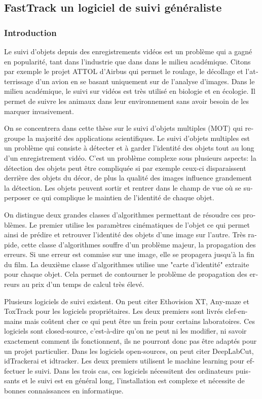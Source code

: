 \begin{otherlanguage}{french}
\subsubsection*{}
\subsection*{FastTrack un logiciel de suivi généraliste}
\subsubsection*{Introduction}
Le suivi d'objets depuis des enregistrements vidéos est un problème qui a gagné en popularité, tant dans l'industrie que dans dans le milieu académique. Citons par exemple le projet ATTOL d'Airbus qui permet le roulage, le décollage et l'atterrissage d'un avion en se basant uniquement sur de l'analyse d'images. Dans le milieu académique, le suivi sur vidéos est très utilisé en biologie et en écologie. Il permet de suivre les animaux dans leur environnement sans avoir besoin de les marquer invasivement.

On se concentrera dans cette thèse sur le suivi d'objets multiples (MOT) qui regroupe la majorité des applications scientifiques. Le suivi d'objets multiples est un problème qui consiste à détecter et à garder l'identité des objets tout au long d'un enregistrement vidéo. C'est un problème complexe sous plusieurs aspects: la détection des objets peut être compliquée si par exemple ceux-ci disparaissent derrière des objets du décor, de plus la qualité des images influence grandement la détection. Les objets peuvent sortir et rentrer dans le champ de vue où se superposer ce qui complique le maintien de l'identité de chaque objet.

On distingue deux grandes classes d'algorithmes permettant de résoudre ces problèmes. Le premier utilise les paramètres cinématiques de l'objet ce qui permet ainsi de prédire et retrouver l'identité des objets d'une image sur l'autre. Très rapide, cette classe d'algorithmes souffre d'un problème majeur, la propagation des erreurs. Si une erreur est commise sur une image, elle se propagera jusqu'à la fin du film. La deuxième classe d'algorithmes utilise une "carte d'identité" extraite pour chaque objet. Cela permet de contourner le problème de propagation des erreurs au prix d'un temps de calcul très élevé.

Plusieurs logiciels de suivi existent. On peut citer Ethovision XT, Any-maze et ToxTrack pour les logiciels propriétaires. Les deux premiers sont livrés clef-en-mains mais coûtent cher ce qui peut être un frein pour certains laboratoires. Ces logiciels sont closed-source, c’est-à-dire qu'on ne peut ni les modifier, ni savoir exactement comment ils fonctionnent, ils ne pourront donc pas être adaptés pour un projet particulier. Dans les logiciels open-sources, on peut citer DeepLabCut, idTrackerai et idtracker. Les deux premiers utilisent le machine learning pour effectuer le suivi. Dans les trois cas, ces logiciels nécessitent des ordinateurs puissants et le suivi est en général long, l'installation est complexe et nécessite de bonnes connaissances en informatique.


\end{otherlanguage}
